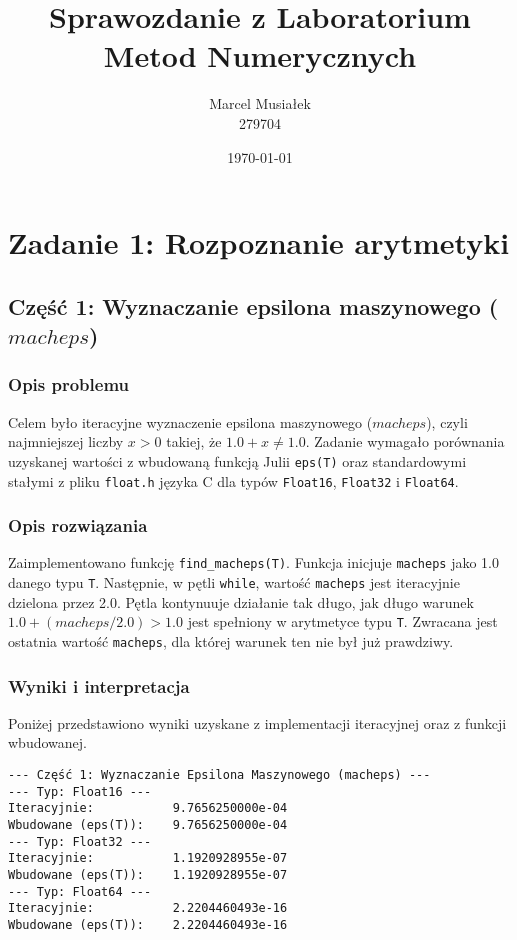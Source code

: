 \documentclass[11pt, a4paper]{article}
\title{Sprawozdanie z Laboratorium Metod Numerycznych}
\author{Marcel Musiałek \\ 279704}
\date{\today}
\begin{document}
\maketitle

\tableofcontents
\newpage

%
%


\section{Zadanie 1: Rozpoznanie arytmetyki}

\subsection{Część 1: Wyznaczanie epsilona maszynowego (\texorpdfstring{$macheps$}{macheps})}

\subsubsection{Opis problemu}
Celem było iteracyjne wyznaczenie epsilona maszynowego ($macheps$), czyli najmniejszej liczby $x > 0$ takiej, że $1.0 + x \neq 1.0$. Zadanie wymagało porównania uzyskanej wartości z wbudowaną funkcją Julii \texttt{eps(T)} oraz standardowymi stałymi z pliku \texttt{float.h} języka C dla typów \texttt{Float16}, \texttt{Float32} i \texttt{Float64}.

\subsubsection{Opis rozwiązania}
Zaimplementowano funkcję \texttt{find\_macheps(T)}. Funkcja inicjuje \texttt{macheps} jako 1.0 danego typu \texttt{T}. Następnie, w pętli \texttt{while}, wartość \texttt{macheps} jest iteracyjnie dzielona przez 2.0. Pętla kontynuuje działanie tak długo, jak długo warunek $1.0 + (macheps / 2.0) > 1.0$ jest spełniony w arytmetyce typu \texttt{T}. Zwracana jest ostatnia wartość \texttt{macheps}, dla której warunek ten nie był już prawdziwy.

\subsubsection{Wyniki i interpretacja}
Poniżej przedstawiono wyniki uzyskane z implementacji iteracyjnej oraz z funkcji wbudowanej.
\begin{verbatim}
--- Część 1: Wyznaczanie Epsilona Maszynowego (macheps) ---
--- Typ: Float16 ---
Iteracyjnie:           9.7656250000e-04
Wbudowane (eps(T)):    9.7656250000e-04
--- Typ: Float32 ---
Iteracyjnie:           1.1920928955e-07
Wbudowane (eps(T)):    1.1920928955e-07
--- Typ: Float64 ---
Iteracyjnie:           2.2204460493e-16
Wbudowane (eps(T)):    2.2204460493e-16
\end{verbatim}
\end{document}
